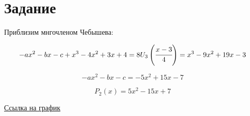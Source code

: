 \section{Задание}

Приблизим мнгочленом Чебышева:

\begin{equation}
    -ax^2 -bx - c + x^3 - 4 x^2 + 3 x + 4 
    = 
    8U_3\left( \cfrac{x-3}{4} \right)
    =
    x^3 - 9 x^2 + 19 x - 3
\end{equation}

\begin{equation}
    -ax^2 -bx - c 
    =
    - 5 x^2 + 15 x - 7
\end{equation}

\begin{equation}
    P_2(x) = 5x^{2}-15x+7
\end{equation}

\href{https://www.desmos.com/calculator/3pv6pjtghp}{Ссылка на график}







